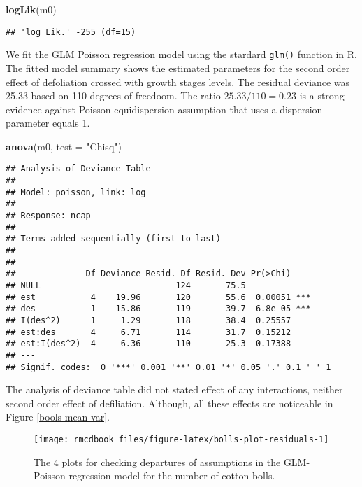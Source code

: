 \documentclass[9pt,a5paper,]{book}
\newenvironment{Shaded}{}{}
\newcommand{\KeywordTok}[1]{\textbf{{#1}}}
\newcommand{\DataTypeTok}[1]{\underline{{#1}}}
\newcommand{\StringTok}[1]{{#1}}
\newcommand{\NormalTok}[1]{{#1}}
\renewenvironment{Shaded}{\color{inputcolor}}{}
\renewcommand{\DataTypeTok}[1]{{#1}}
\theoremstyle{definition}
\theoremstyle{definition}
\theoremstyle{remark}
\begin{document}
\begin{Shaded}
\begin{Highlighting}[]
\KeywordTok{logLik}\NormalTok{(m0)}
\end{Highlighting}
\end{Shaded}

\begin{verbatim}
## 'log Lik.' -255 (df=15)
\end{verbatim}

We fit the GLM Poisson regression model using the stardard
\texttt{glm()} function in R. The fitted model summary shows the
estimated parameters for the second order effect of defoliation crossed
with growth stages levels. The residual deviance was 25.33 based on 110
degrees of freedoom. The ratio \(25.33/110 = 0.23\) is a strong evidence
against Poisson equidispersion assumption that uses a dispersion
parameter equals 1.

\begin{Shaded}
\begin{Highlighting}[]
\KeywordTok{anova}\NormalTok{(m0, }\DataTypeTok{test =} \StringTok{"Chisq"}\NormalTok{)}
\end{Highlighting}
\end{Shaded}

\begin{verbatim}
## Analysis of Deviance Table
## 
## Model: poisson, link: log
## 
## Response: ncap
## 
## Terms added sequentially (first to last)
## 
## 
##              Df Deviance Resid. Df Resid. Dev Pr(>Chi)    
## NULL                           124       75.5             
## est           4    19.96       120       55.6  0.00051 ***
## des           1    15.86       119       39.7  6.8e-05 ***
## I(des^2)      1     1.29       118       38.4  0.25557    
## est:des       4     6.71       114       31.7  0.15212    
## est:I(des^2)  4     6.36       110       25.3  0.17388    
## ---
## Signif. codes:  0 '***' 0.001 '**' 0.01 '*' 0.05 '.' 0.1 ' ' 1
\end{verbatim}

The analysis of deviance table did not stated effect of any
interactions, neither second order effect of defiliation. Although, all
these effects are noticeable in Figure \ref{bools-mean-var}.

\begin{figure}[h]

{\centering \texttt{[image: rmcdbook\_files/figure-latex/bolls-plot-residuals-1]} 

}

\caption{The 4 plots for checking departures of assumptions in the GLM-Poisson regression model for the number of cotton bolls.}\label{fig:bolls-plot-residuals}
\end{figure}
\end{document}
